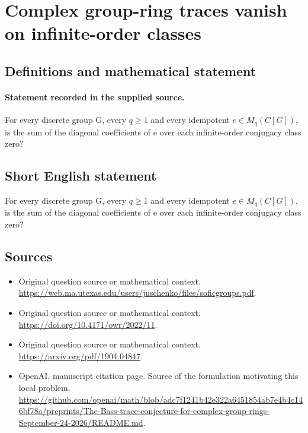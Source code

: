 \documentclass[11pt]{article}
\begin{document}
\section*{Complex group-ring traces vanish on infinite-order classes}\label{30006993}
\subsection{Definitions and mathematical statement}
\paragraph{Statement recorded in the supplied source.}
For every discrete group G, every $q\geq 1$ and every idempotent $e\in M_q(C[G])$, is the sum of the diagonal coefficients of e over each infinite-order conjugacy class zero?
\subsection{Short English statement}
For every discrete group G, every $q\geq 1$ and every idempotent $e\in M_q(C[G])$, is the sum of the diagonal coefficients of e over each infinite-order conjugacy class zero?
\subsection{Sources}
\begin{itemize}
\item[S1] Original question source or mathematical context.
\url{https://web.ma.utexas.edu/users/juschenko/files/soficgroups.pdf}.
\item[S2] Original question source or mathematical context.
\url{https://doi.org/10.4171/owr/2022/11}.
\item[S3] Original question source or mathematical context.
\url{https://arxiv.org/pdf/1904.04847}.
\item[S4] OpenAI, manuscript citation page. Source of the formulation motivating this local problem.
\url{https://github.com/openai/math/blob/adc7f1241b42e322a6451854ab7e4b4c146bf78a/preprints/The-Bass-trace-conjecture-for-complex-group-rings-September-24-2026/README.md}.
\end{itemize}
\end{document}
